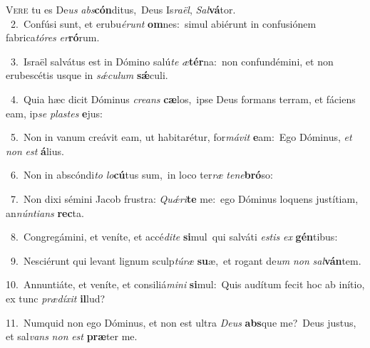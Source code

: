 \lettrine{\initial\textcolor{\initialcolor}{V}}{ere} tu es De\textit{us} \textit{abs}\-\textbf{cón}ditus,~\star Deus Is\-\textit{ra}\-\textit{ël}, \textit{Sal}\-\textbf{vá}tor.\\
{\numbfont\textcolor{\numbcolor}{~2.}}~Confúsi sunt, et erubu\-\textit{é}\-\textit{runt} \textbf{om}\-nes:~\star simul abiérunt in confusiónem fabrica\-\textit{tó}\-\textit{res} \textit{er}\-\textbf{ró}rum.\par
{\numbfont\textcolor{\numbcolor}{~3.}}~Israël salvátus est in Dómino salú\textit{te} \textit{æ}\-\textbf{tér}na:~\star non confundémini, et non erubescétis usque in \textit{sǽ}\-\textit{cu}\textit{lum} \textbf{sǽ}\-culi.\par
{\numbfont\textcolor{\numbcolor}{~4.}}~Quia hæc dicit Dóminus \textit{cre}\-\textit{ans} \textbf{cæ}\-los,~\star ipse Deus formans terram, et fáciens eam, ip\textit{se} \textit{plas}\-\textit{tes} \textbf{e}\-jus:\par
{\numbfont\textcolor{\numbcolor}{~5.}}~Non in vanum creávit eam, ut habitarétur, for\-\textit{má}\-\textit{vit} \textbf{e}\-am:~\star Ego Dóminus, \textit{et} \textit{non} \textit{est} \textbf{á}\-lius.\par
{\numbfont\textcolor{\numbcolor}{~6.}}~Non in abscóndi\textit{to} \textit{lo}\-\textbf{cú}tus sum,~\star in loco ter\textit{ræ} \textit{te}\-\textit{ne}\textbf{bró}so:\par
{\numbfont\textcolor{\numbcolor}{~7.}}~Non dixi sémini Jacob frustra: \textit{Quǽ}\-\textit{ri}\textbf{te} me:~\star ego Dóminus loquens justítiam, an\-\textit{nún}\-\textit{ti}\textit{ans} \textbf{rec}\-ta.\par
{\numbfont\textcolor{\numbcolor}{~8.}}~Congregámini, et veníte, et accé\-\textit{di}\-\textit{te} \textbf{si}\-mul~\star qui salváti \textit{es}\-\textit{tis} \textit{ex} \textbf{gén}\-tibus:\par
{\numbfont\textcolor{\numbcolor}{~9.}}~Nesciérunt qui levant lignum sculp\-\textit{tú}\-\textit{ræ} \textbf{su}\-æ,~\star et rogant de\textit{um} \textit{non} \textit{sal}\-\textbf{ván}tem.\par
{\numbfont\textcolor{\numbcolor}{10.}}~Annuntiáte, et veníte, et consiliá\-\textit{mi}\-\textit{ni} \textbf{si}\-mul:~\star Quis audítum fecit hoc ab inítio, ex tunc \textit{præ}\-\textit{dí}\textit{xit} \textbf{il}\-lud?\par
{\numbfont\textcolor{\numbcolor}{11.}}~Numquid non ego Dóminus, et non est ultra \textit{De}\-\textit{us} \textbf{abs}\-que me?~\star Deus justus, et sal\textit{vans} \textit{non} \textit{est} \textbf{præ}\-ter me.\par
